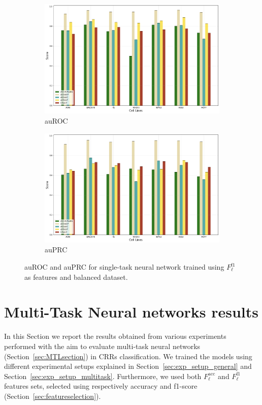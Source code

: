 \begin{figure}[!htbp]
    \centering
    \begin{subfigure}[b]{\textwidth}
        \includegraphics[width=\textwidth]{images/results_plots/single_tasks/balanced_new_auroc.png}
        \caption{auROC}
        \label{fig:auroc_balanced_new}
    \end{subfigure}
    \begin{subfigure}[b]{\textwidth}
        \includegraphics[width=\textwidth]{images/results_plots/single_tasks/balanced_new_auprc.png}
        \caption{auPRC}
        \label{fig:auprc_balanced_new}
    \end{subfigure}
    \caption{auROC and auPRC for single-task neural network trained using $F_\ell^{\textrm{f1}}$ as features and balanced dataset.}\label{fig:balanced_new_results}
\end{figure}

\section{Multi-Task Neural networks results} \label{sec:multi_results}
In this Section we report the results obtained from various experiments performed with the aim to evaluate multi-task neural networks (Section~\ref{sec:MTLsection}) in CRRs classification. We trained the models using different experimental setups explained in Section~\ref{sec:exp_setup_general} and Section~\ref{sec:exp_setup_multitask}. Furthermore, we used both $F_\ell^{\textrm{acc}}$ and $F_\ell^{\textrm{f1}}$ features sets, selected using respectively accuracy and f1-score (Section~\ref{sec:featureselection}).

